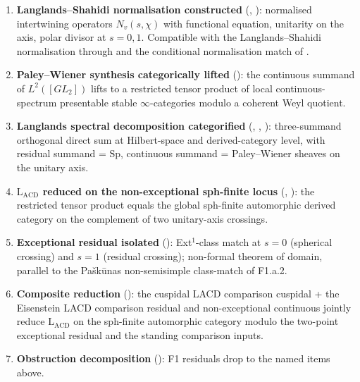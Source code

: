 \begin{enumerate}
\item \textbf{Langlands--Shahidi normalisation constructed}
(,
): normalised intertwining
operators \(N_{v}(s,\chi)\) with functional equation, unitarity on
the axis, polar divisor at \(s=0,1\). Compatible with the Langlands--Shahidi normalisation through
 and the conditional normalisation match of
.
\item \textbf{Paley--Wiener synthesis categorically lifted}
(): the continuous summand of
\(L^{2}([GL_{2}])\) lifts to a restricted tensor product of local
continuous-spectrum presentable stable \(\infty\)-categories modulo
a coherent Weyl quotient.
\item \textbf{Langlands spectral decomposition categorified}
(,
,
): three-summand orthogonal
direct sum at Hilbert-space and derived-category level, with
residual summand = \(\mathrm{Sp}\), continuous summand =
Paley--Wiener sheaves on the unitary axis.
\item \textbf{\(\mathrm{L}_{\mathrm{ACD}}\) reduced on the
non-exceptional sph-finite locus}
(,
): the restricted tensor
product equals the global sph-finite automorphic derived category
on the complement of two unitary-axis crossings.
\item \textbf{Exceptional residual isolated}
():
Ext\({}^{1}\)-class match at \(s=0\) (spherical crossing) and \(s=1\)
(residual crossing); non-formal theorem of domain, parallel to the
Pa{\v s}k{\=u}nas non-semisimple class-match of F1.a.2.
\item \textbf{Composite reduction}
(): the cuspidal LACD comparison cuspidal +
the Eisenstein LACD comparison residual and non-exceptional continuous jointly reduce
\(\mathrm{L}_{\mathrm{ACD}}\) on the sph-finite automorphic category
modulo the two-point exceptional residual and the standing comparison
inputs.
\item \textbf{Obstruction decomposition}
(): F1 residuals drop
to the named items above.
\end{enumerate}

